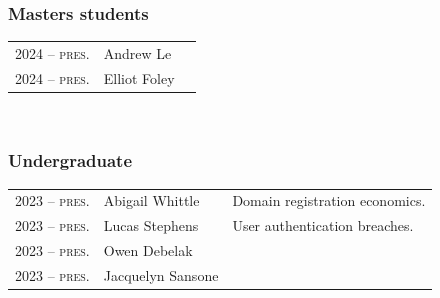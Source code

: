 \documentclass[10pt,singlecolumn]{article} %
\begin{document}
\subsubsection*{Masters students}
\begin{tabular}{rll}
2024 -- \textsc{pres.} & Andrew Le & \\ 
2024 -- \textsc{pres.} & Elliot Foley & \\ 
\end{tabular}\\

\subsubsection*{Undergraduate}
\begin{tabular}{rll}
2023 -- \textsc{pres.} & Abigail Whittle & Domain registration economics.\\ 
2023 -- \textsc{pres.} & Lucas Stephens & User authentication breaches.\\ 
2023 -- \textsc{pres.} & Owen Debelak \\
2023 -- \textsc{pres.} & Jacquelyn Sansone \\


\end{tabular}
\end{document}
